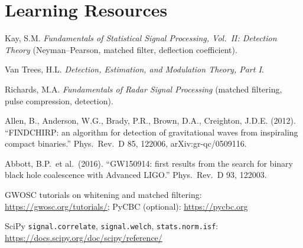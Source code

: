 \documentclass[11pt,a4paper]{article}
\begin{document}
\section*{Learning Resources}
\begin{resources}
  \item Kay, S.M. \emph{Fundamentals of Statistical Signal Processing, Vol.~II: Detection Theory} (Neyman--Pearson, matched filter, deflection coefficient).
  \item Van Trees, H.L. \emph{Detection, Estimation, and Modulation Theory, Part I}.
  \item Richards, M.A. \emph{Fundamentals of Radar Signal Processing} (matched filtering, pulse compression, detection).
\end{resources}
\begin{resources}
  \item Allen, B., Anderson, W.G., Brady, P.R., Brown, D.A., Creighton, J.D.E. (2012). ``FINDCHIRP: an algorithm for detection of gravitational waves from inspiraling compact binaries.'' Phys.\ Rev.\ D 85, 122006, arXiv:gr-qc/0509116.
  \item Abbott, B.P.\ et al.\ (2016). ``GW150914: first results from the search for binary black hole coalescence with Advanced LIGO.'' Phys.\ Rev.\ D 93, 122003.
  \item GWOSC tutorials on whitening and matched filtering: \url{https://gwosc.org/tutorials/}; PyCBC (optional): \url{https://pycbc.org}
\end{resources}
\begin{resources}
  \item SciPy \texttt{signal.correlate}, \texttt{signal.welch}, \texttt{stats.norm.isf}: \url{https://docs.scipy.org/doc/scipy/reference/}
\end{resources}

\evaluation
\end{document}

